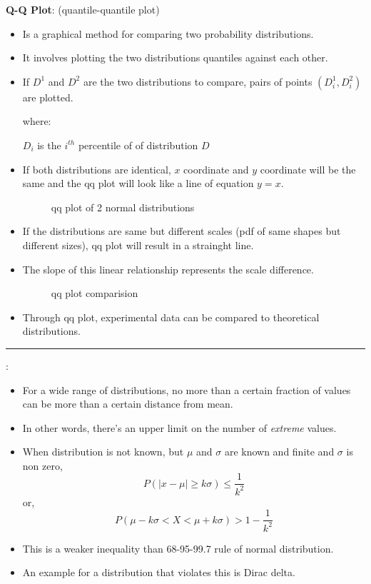 \documentclass[	DIV=calc,%
paper=a4,%
fontsize=11pt,%
twocolumn]{scrartcl} %
\newcommand{\hformbar}[1]{\vspace{5pt}\hrule\vspace{10pt}} %
\newcommand{\formdesc}[1]{\noindent\textbf{#1}}
\begin{document}
\formdesc{Q-Q Plot}: (quantile-quantile  plot)
\begin{itemize}
	\item Is a graphical method for comparing two probability distributions.
	\item It involves plotting the two distributions quantiles against each other.
	\item If $D^1$ and $D^2$ are the two distributions to compare, pairs of points $(D_i^ 1,D_i^ 2)$ are plotted.
	
		where:
		
			$D_i$ is the $i^{th}$ percentile of of distribution $D$
	\item If both distributions are identical, $x$ coordinate and $y$ coordinate will be the same and the qq plot will look like a line of equation $y=x$.
	
	\begin{figure}[ht!]
		\centering
		\caption{qq plot of 2 normal distributions}
		\graphicspath{ {images/math/} }
		
	\end{figure}

	\item If the distributions are same but different scales (pdf of same shapes but different sizes), qq plot will result in a strainght line.
	\item The slope of this linear relationship represents the scale difference.
		\begin{figure}[ht!]
		\centering
		\caption{qq plot comparision}
		\graphicspath{ {images/math/} }
		
	\end{figure}

	\item Through qq plot, experimental data can be compared to theoretical distributions.
\end{itemize}

\hformbar

\formdesc{Chebyshev's Inequality}:

\begin{itemize}
	\item For a wide range of distributions, no more than a certain fraction of values can be more than a certain distance from mean.
	\item In other words, there's an upper limit on the number of \emph{extreme} values. 
	\item When distribution is not known, but $\mu$ and $\sigma$ are known and finite and $\sigma$ is non zero, $$P(|x-\mu|\geq k\sigma) \leq \frac{1}{k^2}$$ or, $$P(\mu-k\sigma < X < \mu+k\sigma) > 1-\frac{1}{k^2}$$
	\item This is a weaker inequality than 68-95-99.7 rule of normal distribution.
	\item An example for a distribution that violates this is Dirac delta.
	
\end{itemize}
\end{document}
